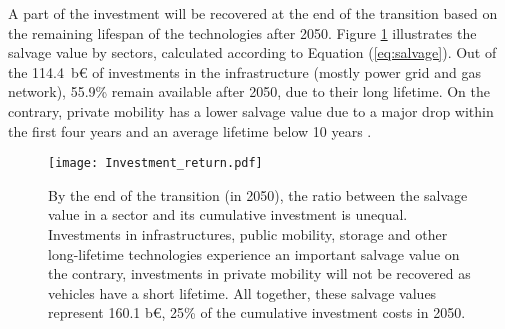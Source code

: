 
A part of the investment will be recovered at the end of the transition based on the remaining lifespan of the technologies after 2050. Figure \ref{fig:pestd_inv_return} illustrates the salvage value by sectors, calculated according to Equation (\ref{eq:salvage}). Out of the 114.4~b€ of investments in the infrastructure (\ie mostly power grid and gas network), 55.9\% remain available after 2050, due to their long lifetime. On the contrary, private mobility has a lower salvage value due to a major drop within the first four years and an average lifetime below 10 years \cite{febiac2021datadigest}. 


\begin{figure}[!htbp]
\centering
\texttt{[image: Investment\_return.pdf]}
\caption{By the end of the transition (\ie in 2050), the ratio between the salvage value in a sector and its cumulative investment is unequal. Investments in infrastructures, public mobility, storage and other long-lifetime technologies experience an important salvage value on the contrary, investments in private mobility will not be recovered as vehicles have a short lifetime. All together, these salvage values represent 160.1 b€, 25\% of the cumulative investment costs in 2050.}
\label{fig:pestd_inv_return}
\end{figure}

